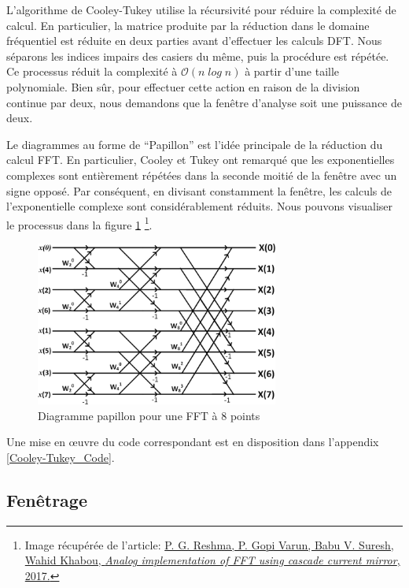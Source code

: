 L'algorithme de Cooley-Tukey utilise la récursivité pour réduire la complexité de calcul. En particulier, la matrice produite par la réduction dans le domaine fréquentiel est réduite en deux parties avant d'effectuer les calculs DFT. Nous séparons les indices impairs des casiers du même, puis la procédure est répétée. Ce processus réduit la complexité à $ \mathcal{O} (n \; log \; n) $ à partir d’une taille polynomiale. Bien sûr, pour effectuer cette action en raison de la division continue par deux, nous demandons que la fenêtre d’analyse soit une puissance de deux.

Le diagrammes au forme de “Papillon” est l'idée principale de la réduction du calcul FFT. En particulier, Cooley et Tukey ont remarqué que les exponentielles complexes sont entièrement répétées dans la seconde moitié de la fenêtre avec un signe opposé. Par conséquent, en divisant constamment la fenêtre, les calculs de l’exponentielle complexe sont considérablement réduits. Nous pouvons visualiser le processus dans la figure \ref{Butterfly} \footnote{Image récupérée de l'article: \href{https://www.researchgate.net/figure/Radix-2-butterfly-diagram-for-8- point-FFT_fig1_312460770}{P. G. Reshma, P. Gopi Varun, Babu V. Suresh, Wahid Khabou, \textit{Analog implementation of FFT using cascade current mirror}, 2017.} \nocite{FFTmirror}}.

    \begin{figure}
        \centering
        \includegraphics[width = 8cm]{Graphs/Butterfly_8-point-FFT.png}
        \caption{Diagramme papillon pour une FFT à 8 points}
        \label{Butterfly}
    \end{figure}

Une mise en œuvre du code correspondant est en disposition dans l'appendix \ref{Cooley-Tukey_Code}.

\subsection{Fenêtrage}

